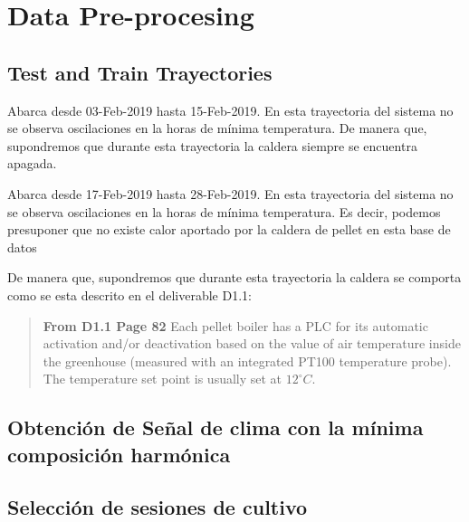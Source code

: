 
    \chapter{Data Pre-procesing }

    \section{Test and Train Trayectories }


\begin{dataset}\label{dataset:noheater}
   Abarca desde 03-Feb-2019 hasta 15-Feb-2019. En esta trayectoria del sistema no se observa oscilaciones en la horas de mínima temperatura. De manera que, supondremos que durante esta trayectoria la caldera siempre se encuentra apagada.
\end{dataset}

\begin{dataset}[Heater]\label{dataset:heater}
    Abarca desde 17-Feb-2019 hasta 28-Feb-2019. En esta trayectoria del sistema no se observa oscilaciones en la horas de mínima temperatura. Es decir, podemos presuponer que no existe calor aportado por la caldera de pellet en esta base de datos
\end{dataset}

De manera que, supondremos que durante esta trayectoria la caldera se comporta como se esta descrito en el deliverable D1.1:
\begin{verse}\textbf{From D1.1 Page 82} 
    Each pellet boiler has a PLC for its automatic activation and/or deactivation based on the value of air temperature inside the greenhouse (measured with an integrated PT100 temperature probe). The temperature set point is usually set at $12 ^\circ C$.
\end{verse}

\section{Obtención de Señal de clima con la mínima composición harmónica}


\section{Selección de sesiones de cultivo}

